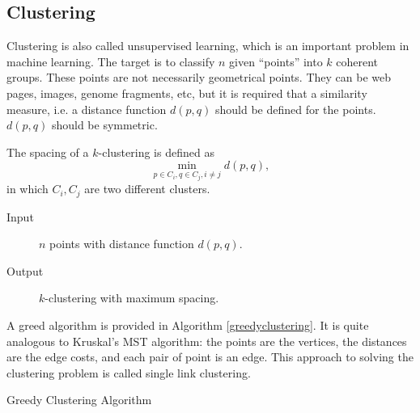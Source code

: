 \subsection{Clustering}
Clustering is also called unsupervised learning, which is an important problem in machine learning. The target is to classify $n$ given ``points'' into $k$ coherent groups. These points are not necessarily geometrical points. They can be web pages, images, genome fragments, etc, but it is required that a similarity measure, i.e. a distance function $d(p,q)$ should be defined for the points. $d(p,q)$ should be symmetric. 
\begin{definition}
The spacing of a $k$-clustering is defined as $$\min\limits_{p\in C_i,q\in C_j,i\neq j}d(p,q),$$ in which $C_i,C_j$ are two different clusters.
\end{definition}
\begin{description}
\item[Input]$n$ points with distance function $d(p,q)$.
\item[Output]$k$-clustering with maximum spacing.
\end{description}
A greed algorithm is provided in Algorithm \ref{greedyclustering}. It is quite analogous to Kruskal's MST algorithm: the points are the vertices, the distances are the edge costs, and each pair of point is an edge. This approach to solving the clustering problem is called single link clustering.
\begin{algorithm}[ht]
\caption{Greedy Clustering Algorithm}\label{greedyclustering}
\begin{algorithmic}[1]
\Repeat
{}
\end{algorithmic}
\end{algorithm}

